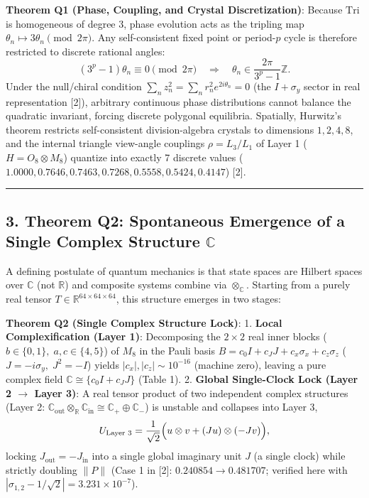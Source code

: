 \documentclass[
  a4paper,
]{article}
\begin{document}
\textbf{Theorem Q1 (Phase, Coupling, and Crystal Discretization)}:
Because \(\mathrm{Tri}\) is homogeneous of degree 3, phase evolution
acts as the tripling map \(\theta_n \mapsto 3\theta_n \pmod{2\pi}\). Any
self-consistent fixed point or period-\(p\) cycle is therefore
restricted to discrete rational angles:
\[(3^p - 1)\theta_n \equiv 0 \pmod{2\pi} \quad \Longrightarrow \quad \theta_n \in \frac{2\pi}{3^p - 1}\mathbb{Z}.\]
Under the null/chiral condition
\(\sum_n z_n^2 = \sum_n r_n^2 e^{2i\theta_n} = 0\) (the \(I + \sigma_y\)
sector in real representation {[}2{]}), arbitrary continuous phase
distributions cannot balance the quadratic invariant, forcing discrete
polygonal equilibria. Spatially, Hurwitz's theorem restricts
self-consistent division-algebra crystals to dimensions \(1, 2, 4, 8\),
and the internal triangle view-angle couplings \(\rho = L_3/L_1\) of
Layer 1 (\(H = O_8 \otimes M_8\)) quantize into exactly 7 discrete
values (\(1.0000, 0.7646, 0.7463, 0.7268, 0.5558, 0.5424, 0.4147\))
{[}2{]}.

\begin{center}\rule{0.5\linewidth}{0.5pt}\end{center}

\subsection{\texorpdfstring{3. Theorem Q2: Spontaneous Emergence of a
Single Complex Structure
\(\mathbb{C}\)}{3. Theorem Q2: Spontaneous Emergence of a Single Complex Structure \textbackslash mathbb\{C\}}}\label{theorem-q2-spontaneous-emergence-of-a-single-complex-structure-mathbbc}

A defining postulate of quantum mechanics is that state spaces are
Hilbert spaces over \(\mathbb{C}\) (not \(\mathbb{R}\)) and composite
systems combine via \(\otimes_{\mathbb{C}}\). Starting from a purely
real tensor \(T \in \mathbb{R}^{64\times 64\times 64}\), this structure
emerges in two stages:

\textbf{Theorem Q2 (Single Complex Structure Lock)}: 1. \textbf{Local
Complexification (Layer 1)}: Decomposing the \(2\times 2\) real inner
blocks (\(b \in \{0,1\},\; a,c \in \{4,5\}\)) of \(M_8\) in the Pauli
basis \(B = c_0 I + c_J J + c_x \sigma_x + c_z \sigma_z\)
(\(J = -i\sigma_y,\; J^2 = -I\)) yields \(|c_x|, |c_z| \sim 10^{-16}\)
(machine zero), leaving a pure complex field
\(\mathbb{C} \cong \{c_0 I + c_J J\}\) (Table 1). 2. \textbf{Global
Single-Clock Lock (Layer 2 \(\to\) Layer 3)}: A real tensor product of
two independent complex structures (Layer 2:
\(\mathbb{C}_{\mathrm{out}} \otimes_{\mathbb{R}} \mathbb{C}_{\mathrm{in}} \cong \mathbb{C}_+ \oplus \mathbb{C}_-\))
is unstable and collapses into Layer 3,
\[U_{\text{Layer 3}} = \frac{1}{\sqrt{2}}\Bigl(u \otimes v + (Ju)\otimes(-Jv)\Bigr),\]
locking \(J_{\mathrm{out}} = -J_{\mathrm{in}}\) into a single global
imaginary unit \(J\) (a single clock) while strictly doubling \(\|P\|\)
(Case 1 in {[}2{]}: \(0.240854 \to 0.481707\); verified here with
\(|\sigma_{1,2} - 1/\sqrt{2}| = 3.231 \times 10^{-7}\)).
\end{document}
